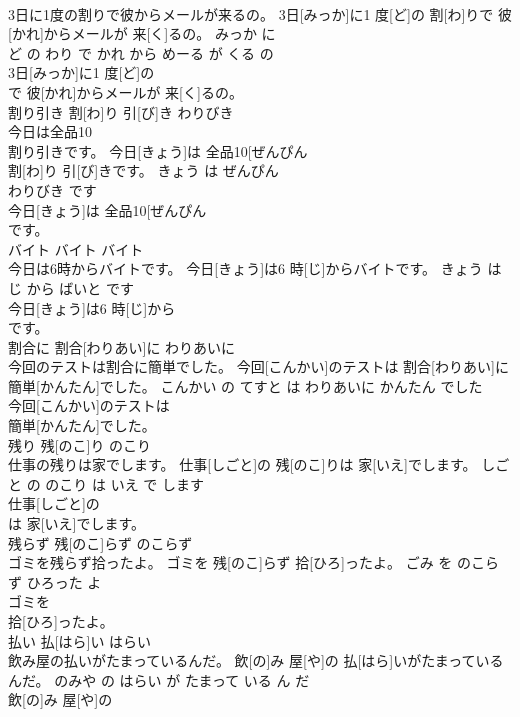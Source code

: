 \documentclass[8pt]{extreport}
\begin{document}
\begin{CJK}{UTF8}{min}
\\	3日に1度の割りで彼からメールが来るの。	3日[みっか]に1 度[ど]の 割[わ]りで 彼[かれ]からメールが 来[く]るの。	みっか に 
\\	ど の わり で かれ から めーる が くる の	
\\	3日[みっか]に1 度[ど]の
\\	で 彼[かれ]からメールが 来[く]るの。			
\\	割り引き	割[わ]り 引[び]き	わりびき	
\\	今日は全品10
\\	割り引きです。	今日[きょう]は 全品10[ぜんぴん 
\\	割[わ]り 引[び]きです。	きょう は ぜんぴん 
\\	わりびき です	
\\	今日[きょう]は 全品10[ぜんぴん 
\\	です。			
\\	バイト	バイト	バイト	
\\	今日は6時からバイトです。	今日[きょう]は6 時[じ]からバイトです。	きょう は 
\\	じ から ばいと です	
\\	今日[きょう]は6 時[じ]から
\\	です。			
\\	割合に	割合[わりあい]に	わりあいに	
\\	今回のテストは割合に簡単でした。	今回[こんかい]のテストは 割合[わりあい]に 簡単[かんたん]でした。	こんかい の てすと は わりあいに かんたん でした	
\\	今回[こんかい]のテストは
\\	簡単[かんたん]でした。			
\\	残り	残[のこ]り	のこり	
\\	仕事の残りは家でします。	仕事[しごと]の 残[のこ]りは 家[いえ]でします。	しごと の のこり は いえ で します	
\\	仕事[しごと]の
\\	は 家[いえ]でします。			
\\	残らず	残[のこ]らず	のこらず	
\\	ゴミを残らず拾ったよ。	ゴミを 残[のこ]らず 拾[ひろ]ったよ。	ごみ を のこらず ひろった よ	
\\	ゴミを
\\	拾[ひろ]ったよ。			
\\	払い	払[はら]い	はらい	
\\	飲み屋の払いがたまっているんだ。	飲[の]み 屋[や]の 払[はら]いがたまっているんだ。	のみや の はらい が たまって いる ん だ	
\\	飲[の]み 屋[や]の

\end{CJK}
\end{document}
